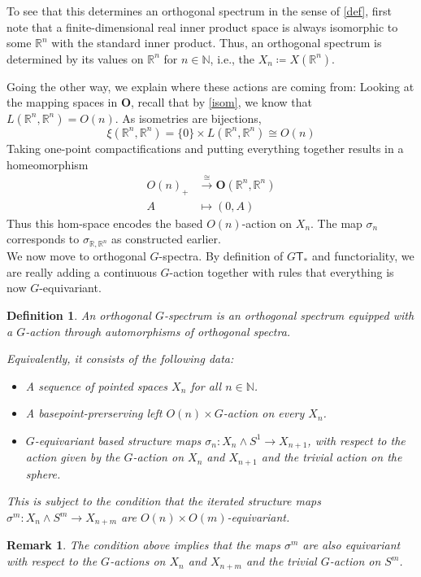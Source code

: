 \documentclass{scrartcl}
\newcommand{\bN}{\mathbb{N}}
\newcommand{\bR}{\mathbb{R}}
\newcommand{\bfO}{\mathbf{O}}
\newtheorem{defin}[subsection]{Definition}
\newtheorem{rem}[subsection]{Remark}
\begin{document}
To see that this determines an orthogonal spectrum in the sense of \ref{def}, first note that a finite-dimensional real inner product space is always isomorphic to some $\bR^n$ with the standard inner product. Thus, an orthogonal spectrum is determined by its values on $\bR^n$ for $n\in\bN$, i.e., the $X_n\coloneqq X(\bR^n)$.
\par Going the other way, we explain where these actions are coming from: Looking at the mapping spaces in $\bfO$, recall that by \ref{isom}, we know that $L(\bR^n,\bR^n)=O(n)$. As isometries are bijections, $$\xi(\bR^n,\bR^n)=\{0\}\times L(\bR^n,\bR^n)\cong O(n)$$ Taking one-point compactifications and putting everything together results in a homeomorphism 
\begin{align*}
    O(n)_+&\xrightarrow{\cong} \bfO(\bR^n,\bR^n) \\
    A&\mapsto (0,A)
\end{align*}
Thus this hom-space encodes the based $O(n)$-action on $X_n$. The map $\sigma_n$ corresponds to $\sigma_{\bR, \bR^n}$ as constructed earlier. \\

We now move to orthogonal $G$-spectra. By definition of $G\mathsf{T}_*$ and functoriality, we are really adding a continuous $G$-action together with rules that everything is now $G$-equivariant.

\begin{defin}\label{alt}
    An orthogonal $G$-spectrum is an orthogonal spectrum equipped with a $G$-action through automorphisms of orthogonal spectra.\par Equivalently, it consists of the following data:
    \begin{itemize}
        \item A sequence of pointed spaces $X_n$ for all $n\in\bN$.
        \item A basepoint-prerserving left $O(n)\times G$-action on every $X_n$.
        \item $G$-equivariant based structure maps $\sigma_n:X_n\wedge S^1\to X_{n+1}$, with respect to the action given by the $G$-action on $X_n$ and $X_{n+1}$ and the trivial action on the sphere. 
    \end{itemize}
    This is subject to the condition that the iterated structure maps $\sigma^m:X_n\wedge S^m\to X_{n+m}$ are $O(n)\times O(m)$-equivariant.
\end{defin}

\begin{rem}
    The condition above implies that the maps $\sigma^m$ are also equivariant with respect to the $G$-actions on $X_n$ and $X_{n+m}$ and the trivial $G$-action on $S^m$.
\end{rem}
\end{document}
